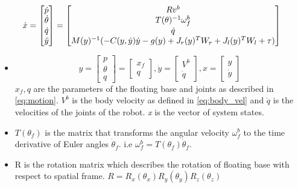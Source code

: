 \begin{equation}
\label{eq:toro}
	\dot{x} = 
	\begin{bmatrix}
	\dot{p} \\ \dot{\theta} \\ \dot{q} \\ \ddot{y}
	\end{bmatrix}
	=
	\begin{bmatrix}
	R v^b\\	
	T(\theta)^{-1} \omega_f^b \\
	\dot{q}\\
	M(y)^{-1}(-C(y,\dot{y})\dot{y} -g(y) +  J_r(y)^{T}W_{r} +J_l(y)^{T}W_{l} + \tau)	
	\end{bmatrix}
	\\
	\end{equation}	
\begin{itemize}
\item $$ y = \begin{bmatrix} p \\ \theta \\ q \end{bmatrix} = \begin{bmatrix} x_f \\ q \end{bmatrix}, \dot{y} = \begin{bmatrix} V^b \\ \dot{q}\end{bmatrix}, x = \begin{bmatrix}y \\ \dot{y}\end{bmatrix} $$  $x_f,q$ are the parameters of the floating base and joints as described in \ref{eq:motion}. $V^b$ is the body velocity as defined in \ref{eq:body_vel} and $\dot{q}$ is the velocities of the joints of the robot. \emph{x} is the vector of system states.
\item $T(\theta_{f})$ is the matrix that transforms the angular velocity $\omega_{f}^{b}$ to the time derivative of Euler angles $\dot{\theta}_{f}$. i.e $\omega_{f}^{b}=T(\theta_{f}) \dot{\theta}_{f}$. 
\item R is the rotation matrix which describes the rotation of floating base with respect to spatial frame. $ R = R_x(\theta_x) R_y(\theta_y) R_z(\theta_z)$
\end{itemize}


